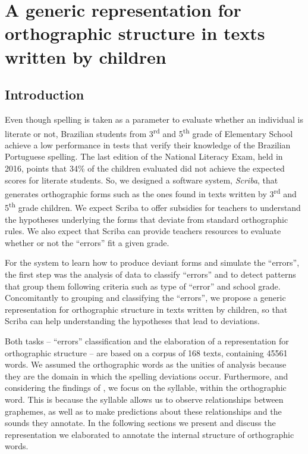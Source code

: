\chapter{A generic representation for orthographic structure in texts written by children}\label{ch:adelaideherci14}
\begin{affils}
\end{affils}

\section{Introduction}
Even though spelling is taken as a parameter to evaluate whether an individual is literate or not, Brazilian students from 3\textsuperscript{rd} and 5\textsuperscript{th} grade of Elementary School achieve a low performance in tests that verify their knowledge of the Brazilian Portuguese spelling. The last edition of the National Literacy Exam, held in 2016, points that 34\% of the children evaluated did not achieve the expected scores for literate students. So, we designed a software system, \emph{Scriba}, that generates orthographic forms such as the ones found in texts written by 3\textsuperscript{rd} and 5\textsuperscript{th} grade children. We expect Scriba to offer subsidies for teachers to understand the hypotheses underlying the forms that deviate from standard orthographic rules. We also expect that Scriba can provide teachers resources to evaluate whether or not the ``errors'' fit a given grade.

For the system to learn how to produce deviant forms and simulate the ``errors'', the first step was the analysis of data to classify ``errors'' and to detect patterns that group them following criteria such as type of ``error'' and school grade.
Concomitantly to grouping and classifying the ``errors'', we propose a generic representation for orthographic structure in texts written by children, so that Scriba can help understanding the hypotheses that lead to deviations.

Both tasks -- ``errors'' classification and the elaboration of a representation for orthographic structure -- are based on a corpus of 168 texts, containing 45561 words.
We assumed the orthographic words as the unities of analysis because they are the domain in which the spelling deviations occur.
Furthermore, and considering the findings of \citet{Chacon2018}, we focus on the syllable, within the orthographic word. This is because the syllable allows us to observe relationships between graphemes, as well as to make predictions about these relationships and the sounds they annotate. In the following sections we present and discuss
the representation we elaborated to annotate the internal structure of orthographic words.

